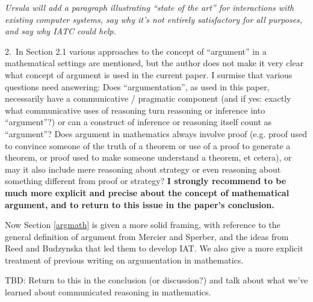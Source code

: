 \emph{Ursula will add a paragraph illustrating ``state of the art''
  for interactions with existing computer systems, say why it's not
  entirely satisfactory for all purposes, and say why IATC could
  help.}

\begin{mdframed}[backgroundcolor=orange!10]
2.~In Section 2.1 various approaches to the concept of ``argument'' in a mathematical settings are mentioned, but the author does not make it very clear what concept of argument is used in the current paper. I surmise that various questions need answering: Does ``argumentation'', as used in this paper, necessarily have a communicative / pragmatic component (and if yes: exactly what communicative uses of reasoning turn reasoning or inference into ``argument''?) or can a construct of inference or reasoning itself count as ``argument''?  Does argument in mathematics always involve proof (e.g. proof used to convince someone of the truth of a theorem or use of a proof to generate a theorem, or proof used to make someone understand a theorem, et cetera), or may it also include mere reasoning about strategy or even reasoning about something different from proof or strategy? \textbf{I strongly recommend to be much more explicit and precise about the concept of mathematical argument, and to return to this issue in the paper's conclusion.}
\end{mdframed}

Now Section \ref{argmath} is given a more solid framing,
with reference to the general definition of argument from Mercier and Sperber,
and the ideas from Reed and Budzynska that led them to develop IAT.
We also give a more explicit treatment of previous writing on
argumentation in mathematics.

TBD: Return to this in the conclusion (or discussion?) and talk about
what we've learned about communicated reasoning in mathematics.



